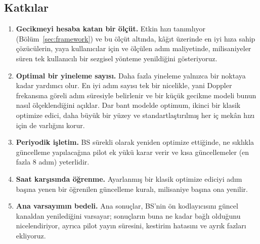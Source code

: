 \subsection{Katkılar}
\begin{enumerate}
    \item \textbf{Gecikmeyi hesaba katan bir ölçüt.} Etkin hızı tanımlıyor (Bölüm~\ref{sec:framework}) ve bu ölçüt altında, kâğıt üzerinde en iyi hıza sahip çözücülerin, yaya kullanıcılar için ve ölçülen adım maliyetinde, milisaniyeler süren tek kullanıcılı bir sezgisel yönteme yenildiğini gösteriyoruz.
    \item \textbf{Optimal bir yineleme sayısı.} Daha fazla yineleme yalnızca bir noktaya kadar yardımcı olur. En iyi adım sayısı tek bir nicelikle, yani Doppler frekansına göreli adım süresiyle belirlenir ve bir küçük gecikme modeli bunun nasıl ölçeklendiğini açıklar. Dar bant modelde optimum, ikinci bir klasik optimize edici, daha büyük bir yüzey ve standartlaştırılmış her iç mekân hızı için de varlığını korur.
    \item \textbf{Periyodik işletim.} BS sürekli olarak yeniden optimize ettiğinde, ne sıklıkla güncelleme yapılacağına pilot ek yükü karar verir ve kısa güncellemeler (en fazla 8 adım) yeterlidir.
    \item \textbf{Saat karşısında öğrenme.} Ayarlanmış bir klasik optimize ediciyi adım başına yenen bir öğrenilen güncelleme kuralı, milisaniye başına ona yenilir.
    \item \textbf{Ana varsayımın bedeli.} Ana sonuçlar, BS'nin ön kodlayıcısını güncel kanaldan yenilediğini varsayar; sonuçların buna ne kadar bağlı olduğunu nicelendiriyor, ayrıca pilot yayın süresini, kestirim hatasını ve ayrık fazları ekliyoruz.
\end{enumerate}

